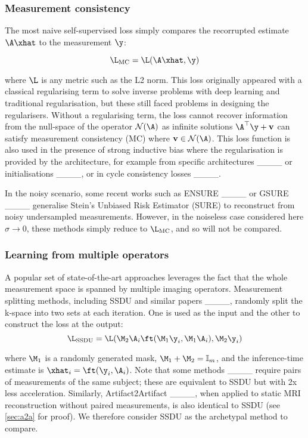 \subsubsection{Measurement consistency}
The most naive self-supervised loss simply compares the recorrupted estimate $\A\xhat$ to the measurement $\y$:

\begin{equation}
    \L_\text{MC}=\L(\A\xhat,\y)
    \label{eq:mc}
\end{equation}

where $\L$ is any metric such as the L2 norm. This loss originally appeared with a classical regularising term to solve inverse problems with deep learning and traditional regularisation, but these still faced problems in designing the regularisers. Without a regularising term, the loss cannot recover information from the null-space of the operator $\mathcal{N}(\A)$ as infinite solutions $\A^\top\y+\mathbf{v}$ can satisfy measurement consistency (MC) where $\mathbf{v}\in\mathcal{N}(\A)$. This loss function is also used in the presence of strong inductive bias where the regularisation is provided by the architecture, for example from specific architectures ____ or initialisations ____, or in cycle consistency losses ____.

In the noisy scenario, some recent works such as ENSURE ____ or GSURE ____ generalise Stein's Unbiased Risk Estimator (SURE) to reconstruct from noisy undersampled measurements. However, in the noiseless case considered here $\sigma\rightarrow0$, these methods simply reduce to $\L_\text{MC}$, and so will not be compared.

\subsubsection{Learning from multiple operators}
A popular set of state-of-the-art approaches leverages the fact that the whole measurement space is spanned by multiple imaging operators. Measurement splitting methods, including SSDU and similar papers ____, randomly split the k-space into two sets at each iteration. One is used as the input and the other to construct the loss at the output:
\begin{equation}
    \L_\text{SSDU}=\L(\M_2\A_i \ft(\M_1\y_i,\M_1\A_i),\M_2\y_i)
    \label{eq:splitting}
\end{equation}

where $\M_1$ is a randomly generated mask, $\M_1+\M_2=\mathbb{I}_m$, and the inference-time estimate is $\xhat_i=\ft(\y_i,\A_i)$. Note that some methods ____ require pairs of measurements of the same subject; these are equivalent to SSDU but with 2x less acceleration. Similarly, Artifact2Artifact ____, when applied to static MRI reconstruction without paired measurements, is also identical to SSDU (see \cref{sec:a2a} for proof). We therefore consider SSDU as the archetypal method to compare.

